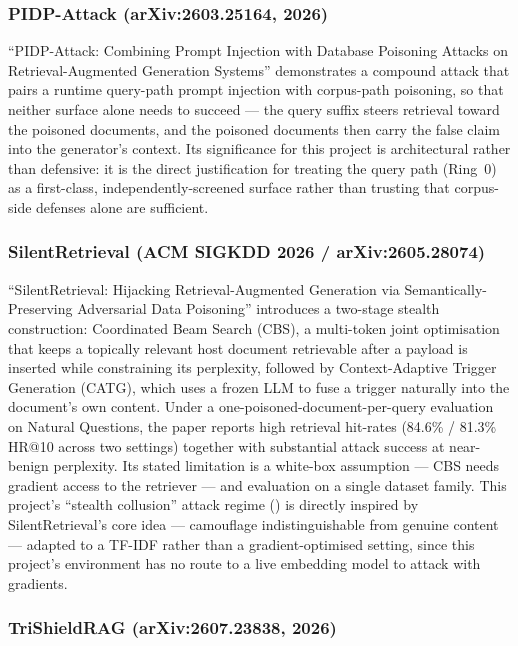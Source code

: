 \subsubsection{PIDP-Attack (arXiv:2603.25164, 2026)}

``PIDP-Attack: Combining Prompt Injection with Database Poisoning Attacks
on Retrieval-Augmented Generation Systems'' demonstrates a compound
attack that pairs a runtime query-path prompt injection with corpus-path
poisoning, so that neither surface alone needs to succeed --- the query
suffix steers retrieval toward the poisoned documents, and the poisoned
documents then carry the false claim into the generator's context. Its
significance for this project is architectural rather than defensive: it
is the direct justification for treating the query path (Ring~0) as a
first-class, independently-screened surface rather than trusting that
corpus-side defenses alone are sufficient.

\subsubsection{SilentRetrieval (ACM SIGKDD 2026 / arXiv:2605.28074)}

``SilentRetrieval: Hijacking Retrieval-Augmented Generation via
Semantically-Preserving Adversarial Data Poisoning'' introduces a
two-stage stealth construction: Coordinated Beam Search (CBS), a
multi-token joint optimisation that keeps a topically relevant host
document retrievable after a payload is inserted while constraining its
perplexity, followed by Context-Adaptive Trigger Generation (CATG), which
uses a frozen LLM to fuse a trigger naturally into the document's own
content. Under a one-poisoned-document-per-query evaluation on Natural
Questions, the paper reports high retrieval hit-rates (84.6\% / 81.3\%
HR@10 across two settings) together with substantial attack success at
near-benign perplexity. Its stated limitation is a white-box assumption
--- CBS needs gradient access to the retriever --- and evaluation on a
single dataset family. This project's ``stealth collusion'' attack
regime () is directly inspired by
SilentRetrieval's core idea --- camouflage indistinguishable from genuine
content --- adapted to a TF-IDF rather than a gradient-optimised setting,
since this project's environment has no route to a live embedding model
to attack with gradients.

\subsubsection{TriShieldRAG (arXiv:2607.23838, 2026)}
\label{sec:trishield-lit}

